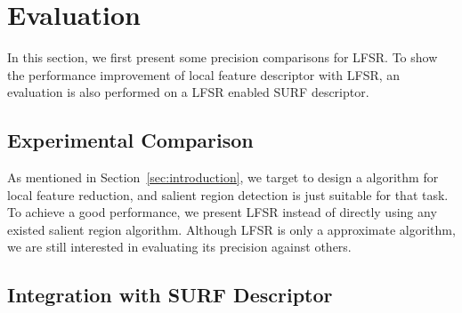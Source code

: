 \section{Evaluation}
\label{sec:evaluation}

In this section, we first present some precision comparisons for LFSR. To show the performance improvement of local feature descriptor with LFSR, an evaluation is also performed on a LFSR enabled SURF descriptor.

\subsection{Experimental Comparison}
\label{sec:evaluation_comparison}

As mentioned in Section~\ref{sec:introduction}, we target to design a algorithm for local feature reduction, and salient region detection is just suitable for that task. To achieve a good performance, we present LFSR instead of directly using any existed salient region algorithm. Although LFSR is only a approximate algorithm, we are still interested in evaluating its precision against others. 

\subsection{Integration with SURF Descriptor}
\label{sec:observaion_integration}

